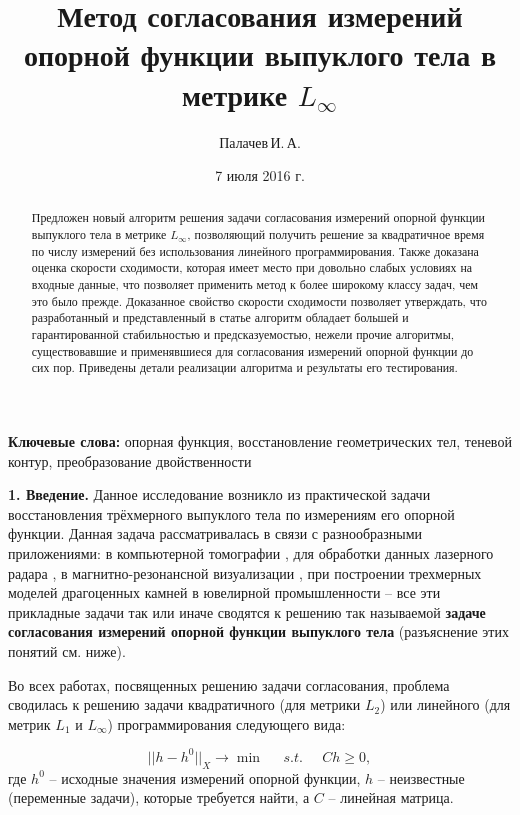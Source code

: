 \documentclass[a4paper, 10pt]{article}
\title{Метод согласования измерений опорной функции выпуклого тела в метрике
$L_{\infty}$}
\author{Палачев\,И.\,А.}
\date{7 июля 2016 г.}
\theoremstyle{definition}
\theoremstyle{plain}
\theoremstyle{plain}
\begin{document}
\maketitle

\begin{abstract}
Предложен новый алгоритм решения задачи согласования измерений опорной функции
выпуклого тела в метрике $L_{\infty}$, позволяющий получить решение за
квадратичное время по числу измерений без использования линейного
программирования.
Также доказана оценка скорости сходимости, которая имеет место при довольно
слабых условиях на входные данные, что позволяет применить метод к более
широкому классу задач, чем это было прежде.
Доказанное свойство скорости сходимости позволяет утверждать, что разработанный
и представленный в статье алгоритм обладает большей  и гарантированной
стабильностью и предсказуемостью, нежели прочие алгоритмы, существовавшие и
применявшиеся для согласования измерений опорной функции до сих пор.
Приведены детали реализации алгоритма и результаты его тестирования.
\end{abstract}

\textbf{Ключевые слова:} опорная функция, восстановление геометрических тел,
теневой контур, преобразование двойственности

\textbf{1. Введение.}
Данное исследование возникло из практической задачи восстановления трёхмерного
выпуклого тела по измерениям его опорной функции. Данная задача рассматривалась
в связи с разнообразными приложениями: в компьютерной томографии
\cite{PrinceWillsky}, для обработки данных лазерного радара
\cite{LeleKulkarniWillsky}, в магнитно-резонансной визуализации
\cite{GregorRannou2001, GregorRannou2002}, при построении трехмерных моделей
драгоценных камней в ювелирной промышленности \cite{palachev} -- все эти
прикладные задачи так или иначе сводятся к решению так называемой
\textbf{задаче согласования измерений опорной функции выпуклого тела}
(разъяснение этих понятий см. ниже).

Во всех работах, посвященных решению задачи согласования, проблема сводилась к
решению задачи квадратичного (для метрики $L_2$) или линейного (для метрик
$L_1$ и $L_\infty$) программирования следующего вида:

\begin{equation*}
 ||h - h^0||_X \to \min \;\;\;\;\; s.t. \;\;\;\;\; C h \ge 0,
\end{equation*}
где $h^0$ -- исходные значения измерений опорной функции, $h$ -- неизвестные
(переменные задачи), которые требуется найти, а $C$ -- линейная матрица.
\end{document}

